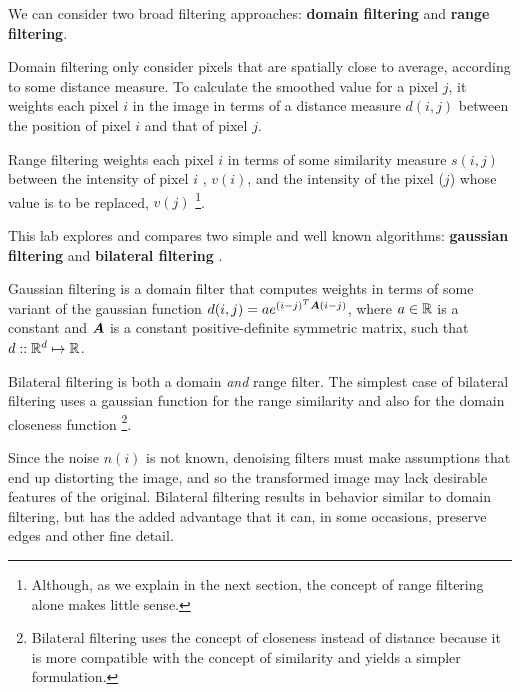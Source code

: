 We can consider two broad filtering approaches: \textbf{domain filtering} and \textbf{range filtering}.

Domain filtering only consider pixels that are spatially close to average, according to some distance measure. To calculate the smoothed value for a pixel $j$, it weights each pixel $i$ in the image in terms of a distance measure $d(i,j)$ between the position of pixel $i$ and that of pixel $j$. 

Range filtering weights each pixel $i$ in terms of some similarity measure $s(i,j)$ between the intensity of pixel $i$    , $v(i)$, and the intensity of the pixel ($j$) whose value is to be replaced, $v(j)$ \footnote{Although, as we explain in the next section, the concept of range filtering alone makes little sense.}. 

This lab explores and compares two simple and well known algorithms: \textbf{gaussian filtering} and \textbf{bilateral filtering} \cite{tomasi1998bilateral}. 

Gaussian filtering is a domain filter that computes weights in terms of some variant of the gaussian function $d(i,j)=a e^{  (i-j)^T \boldsymbol{A} (i-j) }$, where $a \in \mathbb{R}$ is a constant and $\boldsymbol{A}$ is a constant positive-definite symmetric matrix, such that $d :: \mathbb{R}^d \mapsto \mathbb{R}$. 

Bilateral filtering is both a domain \textit{and} range filter. The simplest case of bilateral filtering uses a gaussian function for the range similarity and also for the domain closeness function \footnote{Bilateral filtering uses the concept of closeness instead of distance because it is more compatible with the concept of similarity and yields a simpler formulation.}. 

Since the noise $n(i)$ is not known, denoising filters must make assumptions that end up distorting the image, and so the transformed image may lack desirable features of the original. Bilateral filtering results in behavior similar to domain filtering, but has the added advantage that it can, in some occasions, preserve edges and other fine detail.


